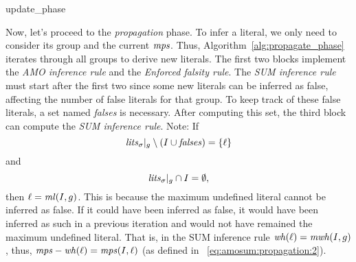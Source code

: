 \begin{algorithm}[H]\small
    \caption{update\_phase}
    \label{alg:update_phase}
\end{algorithm}

Now, let's proceed to the \textit{propagation} phase. 
To infer a literal, we only need to consider its group and the current $\mathit{mps}$. 
Thus, Algorithm~\ref{alg:propagate_phase} iterates through all groups to derive new literals. 
The first two blocks implement the \textit{AMO inference rule} and the \textit{Enforced falsity rule}. 
The \textit{SUM inference rule} must start after the first two since some new literals can be inferred as false, 
affecting the number of false literals for that group. 
To keep track of these false literals, a set named \textit{falses} is necessary. 
After computing this set, the third block can compute the \textit{SUM inference rule}.
Note: If 
\[
\mathit{lits}_\sigma|_g \setminus (I \cup \mathit{falses}) = \{\ell\}
\]
and
\[
\mathit{lits}_\sigma|_g \cap I = \emptyset,
\]
then \(\ell = \mathit{ml}(I,g)\). This is because the maximum undefined literal cannot be inferred as false. If it could have been inferred as false, it would have been inferred as such in a previous iteration and would not have remained the maximum undefined literal.
That is, in the SUM inference rule $\mathit{wh}(\ell) = \mathit{mwh}(I,g)$, 
thus, $\mathit{mps} - \mathit{wh}(\ell) = \mathit{mps}(I,\ell)$ (as defined in ~\eqref{eq:amosum:propagation:2}).

